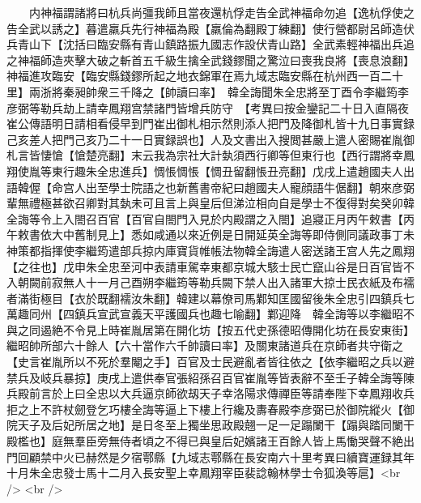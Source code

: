 　　内神福謂諸將曰杭兵尚彊我師且當夜還杭俘走告全武神福命勿追【逸杭俘使之告全武以誘之】暮遣羸兵先行神福為殿【羸倫為翻殿丁練翻】使行營都尉呂師造伏兵青山下【沈括曰臨安縣有青山鎮路振九國志作設伏青山路】全武素輕神福出兵追之神福師造夾擊大破之斬首五千級生擒全武錢鏐聞之驚泣曰喪我良將【喪息浪翻】神福進攻臨安【臨安縣錢鏐所起之地衣錦軍在焉九域志臨安縣在杭州西一百二十里】兩浙將秦昶帥衆三千降之【帥讀曰率】　韓全誨聞朱全忠將至丁酉令李繼筠李彦弼等勒兵劫上請幸鳳翔宫禁諸門皆增兵防守　【考異曰按金鑾記二十日入直隔夜崔公傳語明日請相看侵早到門崔出御札相示然則添人把門及降御札皆十九日事實録己亥差人把門己亥乃二十一日實録誤也】人及文書出入搜閲甚嚴上遣人密賜崔胤御札言皆悽愴【愴楚亮翻】末云我為宗社大計埶須西行卿等但東行也【西行謂將幸鳳翔使胤等東行趣朱全忠進兵】惆悵惆悵【惆丑留翻悵丑亮翻】戊戌上遣趙國夫人出語韓偓【命宫人出至學士院語之也新舊書帝紀曰趙國夫人寵顔語牛倨翻】朝來彦弼輩無禮極甚欲召卿對其埶未可且言上與皇后但涕泣相向自是學士不復得對矣癸卯韓全誨等令上入閤召百官【百官自閤門入見於内殿謂之入閤】追寢正月丙午敕書【丙午敕書依大中舊制見上】悉如咸通以來近例是日開延英全誨等即侍側同議政事丁未神策都指揮使李繼筠遣部兵掠内庫寶貨帷帳法物韓全誨遣人密送諸王宫人先之鳳翔【之往也】戊申朱全忠至河中表請車駕幸東都京城大駭士民亡竄山谷是日百官皆不入朝闕前寂無人十一月己酉朔李繼筠等勒兵闕下禁人出入諸軍大掠士民衣紙及布襦者滿街極目【衣於既翻襦汝朱翻】韓建以幕僚司馬鄴知匡國留後朱全忠引四鎮兵七萬趣同州【四鎮兵宣武宣義天平護國兵也趣七喻翻】鄴迎降　韓全誨等以李繼昭不與之同遏絶不令見上時崔胤居第在開化坊【按五代史孫德昭傳開化坊在長安東街】繼昭帥所部六十餘人【六十當作六千帥讀曰率】及關東諸道兵在京師者共守衛之【史言崔胤所以不死於羣閹之手】百官及士民避亂者皆往依之【依李繼昭之兵以避禁兵及岐兵暴掠】庚戌上遣供奉官張紹孫召百官崔胤等皆表辭不至壬子韓全誨等陳兵殿前言於上曰全忠以大兵逼京師欲刼天子幸洛陽求傳禪臣等請奉陛下幸鳳翔收兵拒之上不許杖劒登乞巧樓全誨等逼上下樓上行纔及夀春殿李彦弼已於御院縱火【御院天子及后妃所居之地】是日冬至上獨坐思政殿翹一足一足蹋闌干【蹋與踏同闌干殿檻也】庭無羣臣旁無侍者頃之不得已與皇后妃嬪諸王百餘人皆上馬慟哭聲不絶出門回顧禁中火已赫然是夕宿鄠縣【九域志鄠縣在長安南六十里考異曰續寶運録其年十月朱全忠發士馬十二月入長安聖上幸鳳翔宰臣裴諗翰林學士令狐渙等扈】<br />
<br />
